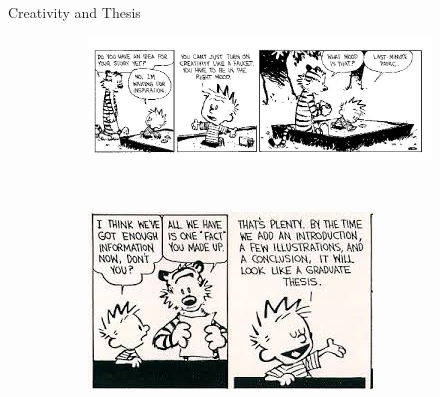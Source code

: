 \documentclass[10pt,times]{beamer}
\begin{document}
\begin{frame}{Creativity and Thesis}
\begin{figure}
  \centering
  \begin{subfigure}[b]{0.85\textwidth}
    \includegraphics[width=\textwidth]
			    {figs/creativity.jpg}
  \end{subfigure}     \\
  \begin{subfigure}[b]{0.5\textwidth}
    \includegraphics[width=\textwidth]{figs/gradthesis.jpg}
  \end{subfigure}    
\end{figure}
\end{frame}
\end{document}
